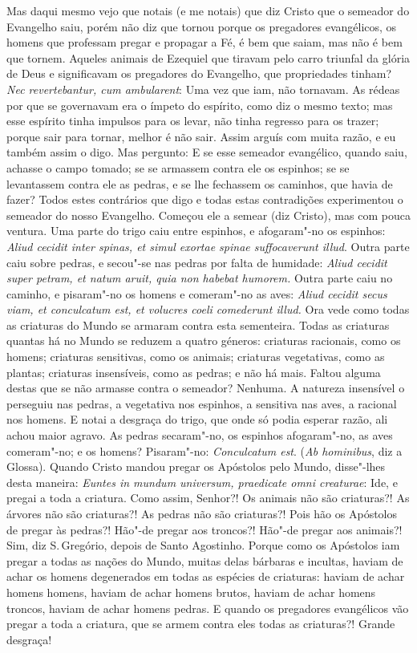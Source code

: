 Mas daqui mesmo vejo que notais (e me notais) que diz Cristo que o
semeador do Evangelho saiu, porém não diz que tornou porque os
pregadores evangélicos, os homens que professam pregar e propagar a Fé,
é bem que saiam, mas não é bem que tornem. Aqueles animais de Ezequiel
que tiravam pelo carro triunfal da glória de Deus e significavam os
pregadores do Evangelho, que propriedades tinham? \emph{Nec
revertebantur, cum ambularent}: Uma vez que iam, não tornavam. As
rédeas por que se governavam era o ímpeto do espírito, como diz o mesmo
texto; mas esse espírito tinha impulsos para os levar, não tinha
regresso para os trazer; porque sair para tornar, melhor é não sair.
Assim arguís com muita razão, e eu também assim o digo. Mas pergunto: E
se esse semeador evangélico, quando saiu, achasse o campo tomado; se se
armassem contra ele os espinhos; se se levantassem contra ele as pedras,
e se lhe fechassem os caminhos, que havia de fazer? Todos estes
contrários que digo e todas estas contradições experimentou o semeador
do nosso Evangelho. Começou ele a semear (diz Cristo), mas com pouca
ventura. Uma parte do trigo caiu entre espinhos, e afogaram"-no os
espinhos: \emph{Aliud cecidit inter spinas, et simul exortae spinae
suffocaverunt illud}. Outra parte caiu sobre pedras, e secou"-se nas
pedras por falta de humidade: \emph{Aliud cecidit super petram, et
natum aruit, quia non habebat humorem.} Outra parte caiu no caminho,
e pisaram"-no os homens e comeram"-no as aves: \emph{Aliud cecidit secus
viam, et conculcatum est, et volucres coeli comederunt illud.} Ora vede
como todas as criaturas do Mundo se armaram contra esta sementeira.
Todas as criaturas quantas há no Mundo se reduzem a quatro géneros: criaturas racionais, como os homens; criaturas sensitivas, como os animais;
criaturas vegetativas, como as plantas; criaturas insensíveis, como as
pedras; e não há mais. Faltou alguma destas que se não armasse contra o
semeador? Nenhuma. A natureza insensível o perseguiu nas pedras, a
vegetativa nos espinhos, a sensitiva nas aves, a racional nos homens.
E notai a desgraça do trigo, que onde só podia esperar razão, ali achou
maior agravo. As pedras secaram"-no, os espinhos afogaram"-no, as aves
comeram"-no; e os homens? Pisaram"-no: \emph{Conculcatum est}. (\emph{Ab
hominibus}, diz a Glossa).
Quando Cristo mandou pregar os Apóstolos pelo Mundo, disse"-lhes desta
maneira: \emph{Euntes in mundum universum, praedicate omni creaturae}:
Ide, e pregai a toda a criatura. Como assim, Senhor?! Os animais não
são criaturas?! As árvores não são criaturas?! As pedras não são
criaturas?! Pois hão os Apóstolos de pregar às pedras?! Hão"-de pregar
aos troncos?! Hão"-de pregar aos animais?! Sim, diz S.\,Gregório, depois
de Santo Agostinho. Porque como os Apóstolos iam pregar a todas as
nações do Mundo, muitas delas bárbaras e incultas, haviam de achar os
homens degenerados em todas as espécies de criaturas: haviam de achar
homens homens, haviam de achar homens brutos, haviam de achar homens
troncos, haviam de achar homens pedras. E quando os pregadores evangélicos vão pregar a toda a criatura, que se armem contra eles todas as
criaturas?! Grande desgraça!

